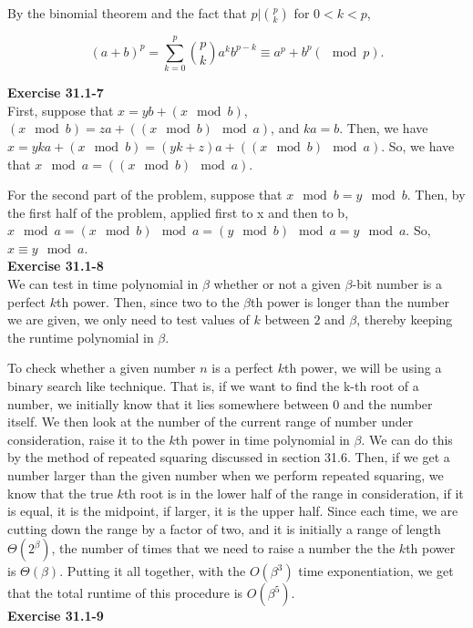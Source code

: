 \documentclass{article}
\begin{document}
By the binomial theorem and the fact that $p | {p \choose k}$ for $0 < k < p$, 

\[ (a+b)^p = \sum_{k=0}^p {p \choose k} a^k b^{p-k} \equiv a^p + b^p (\!\!\!\!\!\!\mod p).\]

\noindent\textbf{Exercise 31.1-7}\\

First, suppose that $x = yb + (x\mod b)$, $(x\mod b) = za + ((x\mod b)\mod a)$, and $ka =b$. Then, we have $x = yka +(x\mod b) = (yk+ z) a + ((x\mod b)\mod a)$. So, we have that $x\mod a =  ((x\mod b)\mod a)$.

For the second part of the problem, suppose that $ x\mod b = y\mod b$. Then, by the first half of the problem, applied first to x and then to b, $x \mod a = (x\mod b) \mod a = (y\mod b)\mod a = y\mod a$. So, $x \equiv y \mod a$.\\

\noindent\textbf{Exercise 31.1-8}\\

We can test in time polynomial in $\beta$ whether or not a given $\beta$-bit number is a perfect $k$th power. Then, since two to the $\beta$th power is longer than the number we are given, we only need to test values of $k$ between $2$ and $\beta$, thereby keeping the runtime polynomial in $\beta$.

To check whether a given number $n$ is a perfect $k$th power, we will be using a binary search like technique. That is, if we want to find the k-th root of a number, we initially know that it lies somewhere between 0 and the number itself. We then look at the number of the current range of number under consideration, raise it to the $k$th power in time polynomial in $\beta$. We can do this by the method of repeated squaring discussed in section 31.6. Then, if we get a number larger than the given number when we perform repeated squaring, we know that the true $k$th root is in the lower half of the range in consideration, if it is equal, it is the midpoint, if larger, it is the upper half. Since each time, we are cutting down the range by a factor of two, and it is initially a range of length $\Theta(2^{\beta})$, the number of times that we need to raise a number the the $k$th power is $\Theta(\beta)$. Putting it all together, with the $O(\beta^3)$ time exponentiation, we get that the total runtime of this procedure is $O(\beta^5)$.\\


\noindent\textbf{Exercise 31.1-9}\\
\end{document}
